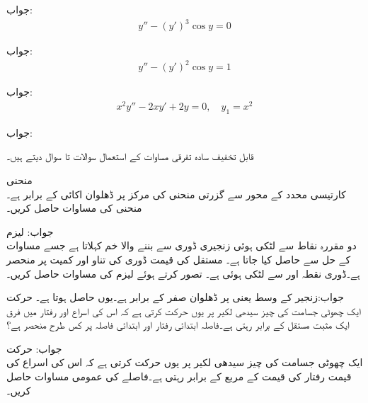جواب:
\begin{align*}
y''-(y')^3 \cos y=0
\end{align*}

جواب:
\begin{align*}
y''-(y')^2 \cos y=1
\end{align*}

جواب:
\begin{align*}
x^2y''-2xy'+2y=0, \quad y_1=x^2
\end{align*}

جواب:

قابل تخفیف سادہ تفرقی مساوات کے استعمال سوالات  تا سوال  دیتے ہیں۔

\quad منحنی\\
کارتیسی محدد کے محور سے گزرتی منحنی  کی مرکز پر ڈھلوان اکائی کے برابر ہے۔منحنی کی مساوات حاصل کریں۔

جواب:
\quad لیزم\\
دو مقررہ نقاط سے لٹکی ہوئی زنجیری ڈوری سے بننے والا خم  کہلاتا ہے جسے مساوات
  کے حل سے حاصل کیا جاتا ہے۔ مستقل  کی قیمت ڈوری کی تناو اور  کمیت پر منحصر ہے۔ڈوری نقطہ   اور  سے لٹکی ہوئی ہے۔  تصور کرتے ہوئے  لیزم کی مساوات حاصل کریں۔

جواب:زنجیر کے وسط یعنی پر ڈھلوان صفر کے برابر ہے۔یوں  حاصل ہوتا ہے۔
\quad حرکت\\
ایک چھوٹی جسامت کی چیز سیدھی لکیر پر یوں حرکت کرتی ہے کہ اس کی اسراع اور رفتار میں فرق ایک مثبت مستقل  کے برابر رہتی ہے۔فاصلہ  ابتدائی رفتار  اور ابتدائی فاصلہ  پر کس طرح منحصر ہے؟

جواب: 
\quad حرکت\\
ایک چھوٹی جسامت کی چیز سیدھی لکیر پر یوں حرکت کرتی ہے کہ اس کی اسراع کی قیمت رفتار کی قیمت کے مربع کے برابر رہتی ہے۔فاصلے کی عمومی مساوات حاصل کریں۔

